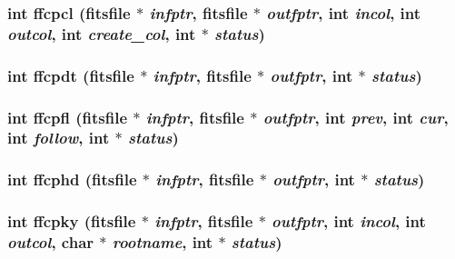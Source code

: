 \subsubsection{\setlength{\rightskip}{0pt plus 5cm}int ffcpcl (\bf{fitsfile} $\ast$ {\em infptr}, \bf{fitsfile} $\ast$ {\em outfptr}, int {\em incol}, int {\em outcol}, int {\em create\_\-col}, int $\ast$ {\em status})}\label{fitsio_8h_c4005499502ddc26787bf95b711a56d5}


\subsubsection{\setlength{\rightskip}{0pt plus 5cm}int ffcpdt (\bf{fitsfile} $\ast$ {\em infptr}, \bf{fitsfile} $\ast$ {\em outfptr}, int $\ast$ {\em status})}\label{fitsio_8h_065331889b563986ac9c35c5b2767397}


\subsubsection{\setlength{\rightskip}{0pt plus 5cm}int ffcpfl (\bf{fitsfile} $\ast$ {\em infptr}, \bf{fitsfile} $\ast$ {\em outfptr}, int {\em prev}, int {\em cur}, int {\em follow}, int $\ast$ {\em status})}\label{fitsio_8h_6b5ccd7589659b89042159ad803ded15}


\subsubsection{\setlength{\rightskip}{0pt plus 5cm}int ffcphd (\bf{fitsfile} $\ast$ {\em infptr}, \bf{fitsfile} $\ast$ {\em outfptr}, int $\ast$ {\em status})}\label{fitsio_8h_fa817efdc02282f5df1032b2d1b8dbaf}


\subsubsection{\setlength{\rightskip}{0pt plus 5cm}int ffcpky (\bf{fitsfile} $\ast$ {\em infptr}, \bf{fitsfile} $\ast$ {\em outfptr}, int {\em incol}, int {\em outcol}, char $\ast$ {\em rootname}, int $\ast$ {\em status})}\label{fitsio_8h_0f50a2acda85502df96986d85ca07b9b}


